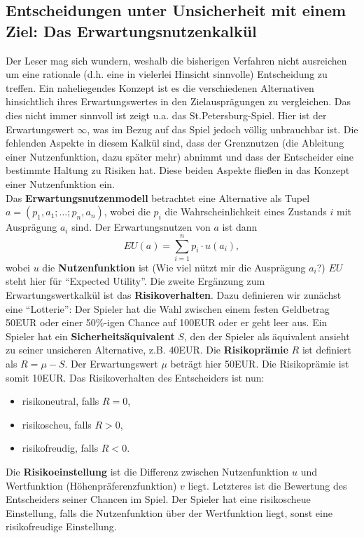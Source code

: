 \subsection{Entscheidungen unter Unsicherheit mit einem Ziel: Das Erwartungsnutzenkalkül}
Der Leser mag sich wundern, weshalb die bisherigen Verfahren nicht ausreichen um eine rationale (d.h. eine in vielerlei Hinsicht sinnvolle) Entscheidung zu treffen. Ein naheliegendes Konzept ist es die verschiedenen Alternativen hinsichtlich ihres Erwartungswertes in den Zielausprägungen zu vergleichen. Das dies nicht immer sinnvoll ist zeigt u.a. das St.Petersburg-Spiel. Hier ist der Erwartungswert \(\infty\), was im Bezug auf das Spiel jedoch völlig unbrauchbar ist. Die fehlenden Aspekte in diesem Kalkül sind, dass der Grenznutzen (die Ableitung einer Nutzenfunktion, dazu später mehr) abnimmt und dass der Entscheider eine bestimmte Haltung zu Risiken hat. Diese beiden Aspekte fließen in das Konzept einer Nutzenfunktion ein.\\
Das \textbf{Erwartungsnutzenmodell} betrachtet eine Alternative als Tupel \(a = (p_1, a_1; \ldots; p_n, a_n)\), wobei die \(p_i\) die Wahrscheinlichkeit eines Zustands \(i\) mit Ausprägung \(a_i\) sind. Der Erwartungsnutzen von \(a\) ist dann
\[
	EU(a) = \sum_{i=1}^n p_i \cdot u(a_i),
\]
wobei \(u\) die \textbf{Nutzenfunktion} ist (Wie viel nützt mir die Ausprägung \(a_i\)?) \(EU\) steht hier für ``Expected Utility''. Die zweite Ergänzung zum Erwartungswertkalkül ist das \textbf{Risikoverhalten}. Dazu definieren wir zunächst eine ``Lotterie'': Der Spieler hat die Wahl zwischen einem festen Geldbetrag 50EUR oder einer 50\%-igen Chance auf 100EUR oder er geht leer aus. Ein Spieler hat ein \textbf{Sicherheitsäquivalent} \(S\), den der Spieler als äquivalent ansieht zu seiner unsicheren Alternative, z.B. 40EUR. Die \textbf{Risikoprämie} \(R\) ist definiert als \(R = \mu - S\). Der Erwartungswert \(\mu\) beträgt hier 50EUR. Die Risikoprämie ist somit 10EUR. Das Risikoverhalten des Entscheiders ist nun:
\begin{itemize}
	\item risikoneutral, falls \(R=0\),
	\item risikoscheu, falls \(R>0\),
	\item risikofreudig, falls \(R<0\).
\end{itemize}
Die \textbf{Risikoeinstellung} ist die Differenz zwischen Nutzenfunktion \(u\) und Wertfunktion (Höhenpräferenzfunktion) \(v\) liegt. Letzteres ist die Bewertung des Entscheiders seiner Chancen im Spiel. Der Spieler hat eine risikoscheue Einstellung, falls die Nutzenfunktion über der Wertfunktion liegt, sonst eine risikofreudige Einstellung.\\

